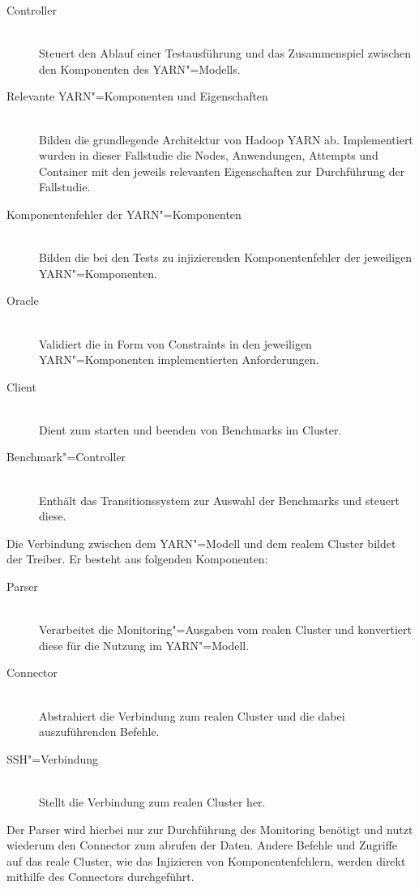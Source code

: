 \begin{description}
    \item [Controller] \hfill \\
        Steuert den Ablauf einer Testausführung und das Zusammenspiel zwischen den Komponenten des \ac{YARN}"=Modells.
    \item [Relevante \ac{YARN}"=Komponenten und Eigenschaften] \hfill \\
        Bilden die grundlegende Architektur von Hadoop \ac{YARN} ab.
        Implementiert wurden in dieser Fallstudie die Nodes, Anwendungen, Attempts und Container mit den jeweils relevanten Eigenschaften zur Durchführung der Fallstudie.
    \item [Komponentenfehler der \ac{YARN}"=Komponenten] \hfill \\
        Bilden die bei den Tests zu injizierenden Komponentenfehler der jeweiligen \ac{YARN}"=Komponenten.
    \item [Oracle] \hfill \\
        Validiert die in Form von Constraints in den jeweiligen \ac{YARN}"=Komponenten implementierten Anforderungen.
    \item [Client] \hfill \\
        Dient zum starten und beenden von Benchmarks im Cluster.
    \item [Benchmark"=Controller] \hfill \\
        Enthält das Transitionssystem zur Auswahl der Benchmarks und steuert diese.
\end{description}

Die Verbindung zwischen dem \ac{YARN}"=Modell und dem realem Cluster bildet der Treiber.
Er besteht aus folgenden Komponenten:

\begin{description}
    \item [Parser] \hfill \\
        Verarbeitet die Monitoring"=Ausgaben vom realen Cluster und konvertiert diese für die Nutzung im \ac{YARN}"=Modell.
    \item [Connector] \hfill \\
        Abstrahiert die Verbindung zum realen Cluster und die dabei auszuführenden Befehle.
    \item [SSH"=Verbindung]  \hfill \\
        Stellt die Verbindung zum realen Cluster her.
\end{description}

Der Parser wird hierbei nur zur Durchführung des Monitoring benötigt und nutzt wiederum den Connector zum abrufen der Daten.
Andere Befehle und Zugriffe auf das reale Cluster, wie \zB das Injizieren von Komponentenfehlern, werden direkt mithilfe des Connectors durchgeführt.

